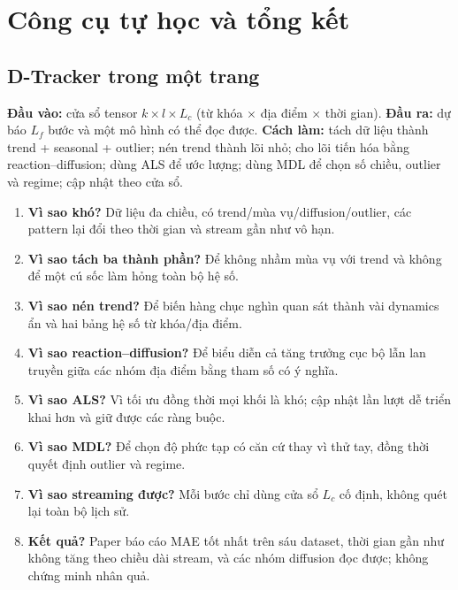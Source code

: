 \section{Công cụ tự học và tổng kết}
\label{app:learning}

\subsection*{D-Tracker trong một trang}

\begin{keypoint}
\textbf{Đầu vào:} cửa sổ tensor $k\times l\times L_c$ (từ khóa $\times$ địa điểm $\times$ thời gian).
\textbf{Đầu ra:} dự báo $L_f$ bước và một mô hình có thể đọc được.
\textbf{Cách làm:} tách dữ liệu thành trend + seasonal + outlier; nén trend thành lõi nhỏ; cho lõi
tiến hóa bằng reaction--diffusion; dùng ALS để ước lượng; dùng MDL để chọn số chiều, outlier và
regime; cập nhật theo cửa sổ.
\end{keypoint}

\begin{enumerate}
  \item \textbf{Vì sao khó?} Dữ liệu đa chiều, có trend/mùa vụ/diffusion/outlier, các pattern lại
        đổi theo thời gian và stream gần như vô hạn.
  \item \textbf{Vì sao tách ba thành phần?} Để không nhầm mùa vụ với trend và không để một cú sốc
        làm hỏng toàn bộ hệ số.
  \item \textbf{Vì sao nén trend?} Để biến hàng chục nghìn quan sát thành vài dynamics ẩn và hai
        bảng hệ số từ khóa/địa điểm.
  \item \textbf{Vì sao reaction--diffusion?} Để biểu diễn cả tăng trưởng cục bộ lẫn lan truyền giữa
        các nhóm địa điểm bằng tham số có ý nghĩa.
  \item \textbf{Vì sao ALS?} Vì tối ưu đồng thời mọi khối là khó; cập nhật lần lượt dễ triển khai
        hơn và giữ được các ràng buộc.
  \item \textbf{Vì sao MDL?} Để chọn độ phức tạp có căn cứ thay vì thử tay, đồng thời quyết định
        outlier và regime.
  \item \textbf{Vì sao streaming được?} Mỗi bước chỉ dùng cửa sổ $L_c$ cố định, không quét lại toàn
        bộ lịch sử.
  \item \textbf{Kết quả?} Paper báo cáo MAE tốt nhất trên sáu dataset, thời gian gần như không tăng
        theo chiều dài stream, và các nhóm diffusion đọc được; không chứng minh nhân quả.
\end{enumerate}

